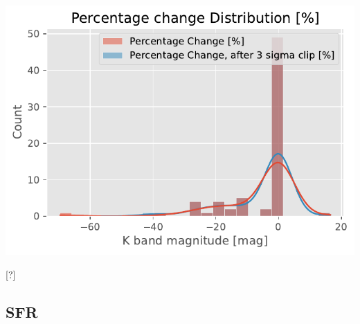 \documentclass[
]{article}
\begin{document}
\includegraphics{compare_files/figure-pdf/cell-42-output-1.pdf}

{[}?{]}

\subsection{SFR}\label{sfr}
\end{document}
